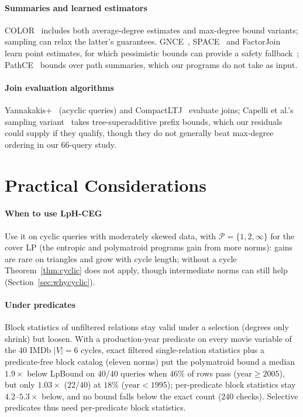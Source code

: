 \documentclass[conference]{IEEEtran}
\begin{document}
\paragraph{Summaries and learned estimators}
COLOR~\cite{deeds2025color} includes both average-degree estimates and max-degree bound variants; sampling can relax the latter's guarantees. GNCE~\cite{schwabe2024gnce}, SPACE~\cite{aytimur2025space} and FactorJoin~\cite{wu2023factorjoin} learn point estimates, for which pessimistic bounds can provide a safety fallback~\cite{abokhamis2025pessimistic}; PathCE~\cite{wang2025pathce} bounds over path summaries, which our programs do not take as input.

\paragraph{Join evaluation algorithms}
Yannakakis+~\cite{wang2025yannakakis} (acyclic queries) and CompactLTJ~\cite{arroyuelo2025compactltj} evaluate joins; Capelli et al.'s sampling variant~\cite{capelli2025simple} takes tree-superadditive prefix bounds, which our residuals could supply if they qualify, though they do not generally beat max-degree ordering in our $66$-query study.

\section{Practical Considerations}
\label{sec:practical}

\paragraph{When to use LpH-CEG}
Use it on cyclic queries with moderately skewed data, with $\mathcal{P} = \{1,2,\infty\}$ for the cover LP (the entropic and polymatroid programs gain from more norms): gains are rare on triangles and grow with cycle length; without a cycle Theorem~\ref{thm:cyclic} does not apply, though intermediate norms can still help (Section~\ref{sec:whycyclic}).

\paragraph{Under predicates} Block statistics of unfiltered relations stay valid under a selection (degrees only shrink) but loosen. With a production-year predicate on every movie variable of the $40$ IMDb $|V|{=}6$ cycles, exact filtered single-relation statistics plus a predicate-free block catalog (eleven norms) put the polymatroid bound a median $1.9\times$ below LpBound on $40/40$ queries when $46\%$ of rows pass ($\text{year}{\ge}2005$), but only $1.03\times$ ($22/40$) at $18\%$ ($\text{year}{<}1995$); per-predicate block statistics stay $4.2$--$5.3\times$ below, and no bound falls below the exact count ($240$ checks). Selective predicates thus need per-predicate block statistics.
\end{document}
